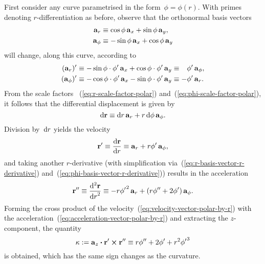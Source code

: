 First consider any curve parametrised in the form~$\phi = \phi (r)$.
With primes denoting $r$-differentiation as before,
observe that the orthonormal basis vectors
\begin{align}
  \mathop{}\!\boldsymbol{\mathbf{a}}_{r} &\equiv \cos\phi \mathop{}\!\boldsymbol{\mathbf{a}}_{x} + \sin\phi \mathop{}\!\boldsymbol{\mathbf{a}}_{y},
    \label{eq:r-basis-vector} \\
  \mathop{}\!\boldsymbol{\mathbf{a}}_{\phi} &\equiv -\sin\phi \mathop{}\!\boldsymbol{\mathbf{a}}_{x} + \cos\phi \mathop{}\!\boldsymbol{\mathbf{a}}_{y}
    \label{eq:phi-basis-vector}
\end{align}
will change, along this curve, according to
\begin{align}
  (\basisvec{r})'
  &\ideq -\sin\phi \cdot \phi' \basisvec{x} + \cos\phi \cdot \phi' \basisvec{y}
  \ideq \+\phi' \basisvec{\phi},
    \label{eq:r-basis-vector-r-derivative} \\
  (\basisvec{\phi})'
  &\ideq -\cos\phi \cdot \phi' \basisvec{x} - \sin\phi \cdot \phi' \basisvec{y}
  \ideq -\phi' \basisvec{r}.
    \label{eq:phi-basis-vector-r-derivative}
\end{align}
From the scale factors~%
  (\ref{eq:r-scale-factor-polar}) and~(\ref{eq:phi-scale-factor-polar}),
it follows that the differential displacement is given by
\begin{equation}
  \mathop{}\!\mathrm{d}\boldsymbol{\mathbf{r}} \equiv \mathop{}\!\mathrm{d} r \mathop{}\!\boldsymbol{\mathbf{a}}_{r} + r \mathop{}\!\mathrm{d}\phi \mathop{}\!\boldsymbol{\mathbf{a}}_{\phi}.
  \label{eq:differential-displacement-polar}
\end{equation}
Division by~$\mathop{}\!\mathrm{d} r$ yields the velocity
\begin{equation}
  \vec{r}' \ideq \tder{\vec{r}}{r} \ideq
  \basisvec{r} + r \phi' \basisvec{\phi},
  \label{eq:velocity-vector-polar-by-r}
\end{equation}
and taking another $r$-derivative
(with simplification via~(\ref{eq:r-basis-vector-r-derivative})
and~(\ref{eq:phi-basis-vector-r-derivative}))
results in the acceleration
\begin{equation}
  \vec{r}'' \ideq \tder[2]{\vec{r}}{r} \ideq
  -r {\phi'}^2 \basisvec{r}
    +
  \roundbr*{r \phi'' + 2 \phi'} \basisvec{\phi}.
  \label{eq:acceleration-vector-polar-by-r}
\end{equation}
Forming the cross product of
the velocity~(\ref{eq:velocity-vector-polar-by-r})
with the acceleration~(\ref{eq:acceleration-vector-polar-by-r})
and extracting the $z$-component,
the quantity
\begin{equation}
  \kappa :=
  \mathop{}\!\boldsymbol{\mathbf{a}}_{z} \boldsymbol{\cdot} \boldsymbol{\mathbf{r}}' \boldsymbol{\times} \boldsymbol{\mathbf{r}}'' \equiv
  r \phi'' + 2 \phi' + r^2 {\phi'}^3
  \label{eq:kappa-polar-by-r}
\end{equation}
is obtained,
which has the same sign changes as the curvature.

